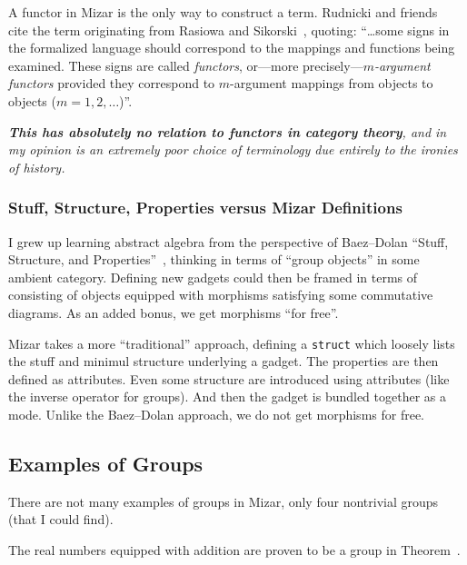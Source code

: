 \begin{aside}
A functor in Mizar is the only way to construct a term. Rudnicki and
friends~\cite{rudnicki2001commutative} cite the term originating from
Rasiowa and Sikorski~\cite[see p.148]{rasiowa1963mathematics},
quoting: ``\dots some signs in the formalized language should correspond
to the mappings and functions being examined. These signs are called
\emph{functors}, or---more precisely---\emph{$m$-argument functors}
provided they correspond to $m$-argument mappings from objects to
objects ($m = 1, 2, \dots$)''.

\emph{\textbf{This has absolutely no relation to functors in category theory},
and in my opinion is an extremely poor
choice of terminology due entirely to the ironies of history.}
%
\end{aside}

\subsubsection{Stuff, Structure, Properties versus Mizar Definitions}
I grew up learning abstract algebra from the perspective of Baez--Dolan
``Stuff, Structure, and Properties''~\cite{baez2001finite,baez2004qg-lectures,baez2006quantum,baez2010lectures}, thinking in terms of ``group objects''
in some ambient category. Defining new gadgets could then be framed in
terms of consisting of objects equipped with morphisms satisfying some
commutative diagrams. As an added bonus, we get morphisms ``for free''.

Mizar takes a more ``traditional'' approach, defining a
\lstinline{struct} which loosely lists the stuff and minimul structure
underlying a gadget. The properties are then defined as attributes. Even
some structure are introduced using attributes (like the inverse
operator for groups). And then the gadget is bundled together as a
mode. Unlike the Baez--Dolan approach, we do not get morphisms for free.

\subsection{Examples of Groups}
There are not many examples of groups in Mizar, only four nontrivial
groups (that I could find).

\begin{example}
  The real numbers equipped with addition are proven to be a group in
  Theorem~.
\end{example}

